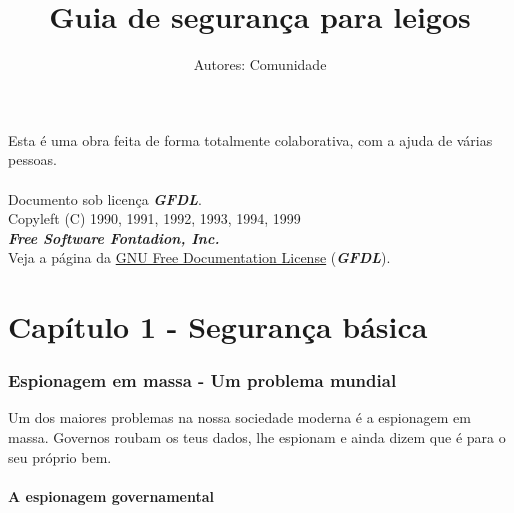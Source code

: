\documentclass[12pt, letterpaper, DejaVuSansMono:12]{report}
\title{\Huge Guia de seguran\c{c}a para leigos} %
\author{Autores: Comunidade} %
\begin{document}
\maketitle %
\tableofcontents

\pagebreak

Esta é uma obra feita de forma totalmente colaborativa, com a ajuda de várias pessoas.\\
\\


Documento sob licença \textit{\textbf{GFDL}}.\\
Copyleft (C) 1990, 1991, 1992, 1993, 1994, 1999\\
	\textit{\textbf{Free Software Fontadion, Inc.}}\\
Veja a página da \href{https://www.gnu.org/licenses/fdl.html}{GNU Free Documentation License} (\textit{\textbf{GFDL}}).\\

\pagebreak

\pagebreak %

\part{Capítulo 1 - Segurança básica}

\section{Espionagem em massa - Um problema mundial} %

\large Um dos maiores problemas na nossa sociedade moderna é a espionagem em massa. Governos roubam os teus dados, lhe espionam e ainda dizem que é para o seu próprio bem.\\

\subsection{A espionagem governamental}
\end{document}
